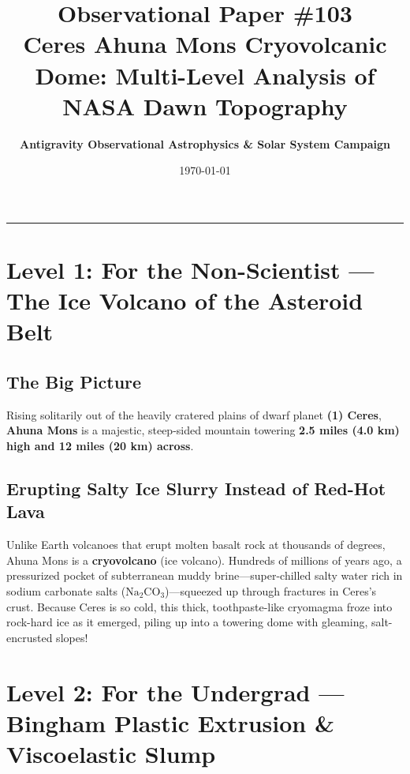 \documentclass[11pt,a4paper]{article}
\title{\Huge \textbf{Observational Paper \#103}\\ \Large Ceres Ahuna Mons Cryovolcanic Dome: Multi-Level Analysis of NASA Dawn Topography}
\author{\textbf{Antigravity Observational Astrophysics \& Solar System Campaign}}
\date{\today}
\begin{document}
\maketitle

\vspace{-1em}
\begin{center}
\rule{\textwidth}{1.5pt}
\end{center}

\section*{Level 1: For the Non-Scientist — The Ice Volcano of the Asteroid Belt}

\subsection*{The Big Picture}
Rising solitarily out of the heavily cratered plains of dwarf planet \textbf{(1) Ceres}, \textbf{Ahuna Mons} is a majestic, steep-sided mountain towering \textbf{2.5 miles (4.0 km) high and 12 miles (20 km) across}.

\subsection*{Erupting Salty Ice Slurry Instead of Red-Hot Lava}
Unlike Earth volcanoes that erupt molten basalt rock at thousands of degrees, Ahuna Mons is a \textbf{cryovolcano} (ice volcano). Hundreds of millions of years ago, a pressurized pocket of subterranean muddy brine—super-chilled salty water rich in sodium carbonate salts ($\mathrm{Na}_2\mathrm{CO}_3$)—squeezed up through fractures in Ceres's crust. Because Ceres is so cold, this thick, toothpaste-like cryomagma froze into rock-hard ice as it emerged, piling up into a towering dome with gleaming, salt-encrusted slopes!

\newpage

\section*{Level 2: For the Undergrad — Bingham Plastic Extrusion \& Viscoelastic Slump}
\end{document}
